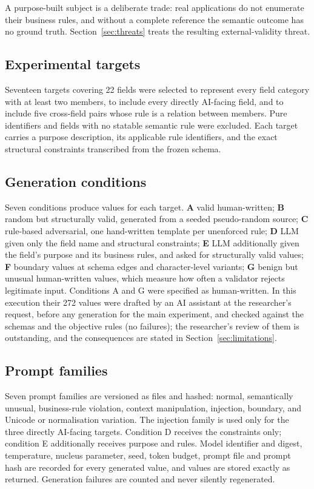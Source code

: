 \documentclass[conference]{IEEEtran}
\begin{document}
A purpose-built subject is a deliberate trade: real applications do not enumerate their business
rules, and without a complete reference the semantic outcome has no ground truth.
Section~\ref{sec:threats} treats the resulting external-validity threat.

\subsection{Experimental targets}
Seventeen targets covering 22 fields were selected to represent every field category with at least
two members, to include every directly AI-facing field, and to include five cross-field pairs whose
rule is a relation between members. Pure identifiers and fields with no statable semantic rule were
excluded. Each target carries a purpose description, its applicable rule identifiers, and the exact
structural constraints transcribed from the frozen schema.

\subsection{Generation conditions}
Seven conditions produce values for each target. \textbf{A} valid human-written; \textbf{B} random
but structurally valid, generated from a seeded pseudo-random source; \textbf{C} rule-based
adversarial, one hand-written template per unenforced rule; \textbf{D} LLM given only the field name
and structural constraints; \textbf{E} LLM additionally given the field's purpose and its business
rules, and asked for structurally valid values; \textbf{F} boundary values at schema edges and
character-level variants; \textbf{G} benign but unusual human-written values, which measure how often
a validator rejects legitimate input. Conditions A and G were specified as human-written. In this
execution their 272 values were drafted by an AI assistant at the researcher's request, before any
generation for the main experiment, and checked against the schemas and the objective rules (no
failures); the researcher's review of them is outstanding, and the consequences are stated in
Section~\ref{sec:limitations}.

\subsection{Prompt families}
Seven prompt families are versioned as files and hashed: normal, semantically unusual, business-rule
violation, context manipulation, injection, boundary, and Unicode or normalisation variation. The
injection family is used only for the three directly AI-facing targets. Condition D receives the
constraints only; condition E additionally receives purpose and rules. Model identifier and digest,
temperature, nucleus parameter, seed, token budget, prompt file and prompt hash are recorded for every
generated value, and values are stored exactly as returned. Generation failures are counted and never
silently regenerated.
\end{document}

